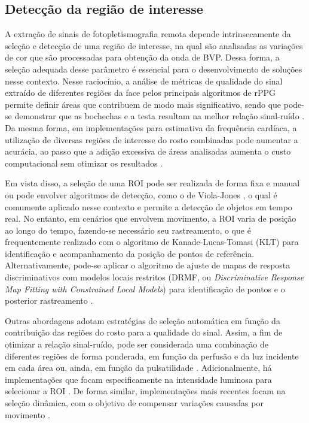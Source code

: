 \subsection{Detecção da região de interesse}

A extração de sinais de fotopletismografia remota depende intrinsecamente da seleção e detecção de uma região de interesse, na qual são analisadas as variações de cor que são processadas para obtenção da onda de BVP. Dessa forma, a seleção adequada desse parâmetro é essencial para o desenvolvimento de soluções nesse contexto. Nesse raciocínio, a análise de métricas de qualidade do sinal extraído de diferentes regiões da face pelos principais algoritmos de rPPG permite definir áreas que contribuem de modo mais significativo, sendo que pode-se demonstrar que as bochechas e a testa resultam na melhor relação sinal-ruído \cite{kim2021assessment, kwon2015roi}. Da mesma forma, em implementações para estimativa da frequência cardíaca, a utilização de diversas regiões de interesse do rosto combinadas pode aumentar a acurácia, ao passo que a adição excessiva de áreas analisadas aumenta o custo computacional sem otimizar os resultados \cite{bondarenko2025role}. 

Em vista disso, a seleção de uma ROI pode ser realizada de forma fixa e manual \cite{verkruysse2008remote} ou pode envolver algoritmos de detecção, como o de Viola-Jones \cite{viola2001rapid, viola2004robust}, o qual é comumente aplicado nesse contexto e permite a detecção de objetos em tempo real. No entanto, em cenários que envolvem movimento, a ROI varia de posição ao longo do tempo, fazendo-se necessário seu rastreamento, o que é frequentemente realizado com o algoritmo de Kanade-Lucas-Tomasi (KLT) \cite{tomasi1991detection} para identificação e acompanhamento da posição de pontos de referência. Alternativamente, pode-se aplicar o algoritmo de ajuste de mapas de resposta discriminativos com modelos locais restritos (DRMF, ou \textit{Discriminative Response Map Fitting with Constrained Local Models}) para identificação de pontos e o posterior rastreamento \cite{liu2021manet, li2014remote}.

Outras abordagens adotam estratégias de seleção automática em função da contribuição das regiões do rosto para a qualidade do sinal. Assim, a fim de otimizar a relação sinal-ruído, pode ser considerada uma combinação de diferentes regiões de forma ponderada, em função da perfusão e da luz incidente em cada área \cite{kumar2015distanceppg} ou, ainda, em função da pulsatilidade \cite{bobbia2019unsupervised}. Adicionalmente, há implementações que focam especificamente na intensidade luminosa para selecionar a ROI \cite{bousefsaf2017automatic}. De forma similar, implementações mais recentes focam na seleção dinâmica, com o objetivo de compensar variações causadas por movimento \cite{nagar2024r2i}.

